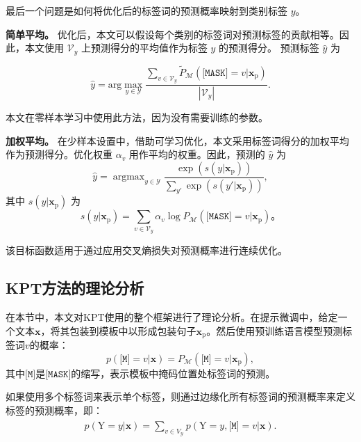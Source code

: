 最后一个问题是如何将优化后的标签词的预测概率映射到类别标签 $y$。

\textbf{简单平均。} 优化后，本文可以假设每个类别的标签词对预测标签的贡献相等。因此，本文使用 $\mathcal{V}_y$ 上预测得分的平均值作为标签 $y$ 的预测得分。
预测标签 $\hat{y}$ 为

\begin{equation}
\hat{y}\!=\!
    \mathrm{arg}\!\max_{y\in\mathcal{Y}}\frac{\sum_{v \in \mathcal{V}_{y}}\! \tilde{P}_{\mathcal{M}}(\!\texttt{[MASK]}=v|\mathbf{x}_{\text{p}})}{|\mathcal{V}_y|}.
\end{equation}

本文在零样本学习中使用此方法，因为没有需要训练的参数。

\textbf{加权平均。} 在少样本设置中，借助可学习优化，本文采用标签词得分的加权平均作为预测得分。优化权重 $\alpha_v$ 用作平均的权重。因此，预测的 $\hat{y}$ 为
\begin{equation}
\hat{y} \!= \operatorname{argmax}_{y\in\mathcal{Y}} \frac{\exp\left({s(y|\mathbf{x}_{\text{p}})}\right)}{\sum_{y'}\exp\left({s({y'}|\mathbf{x}_{\text{p}})}\right)},
\end{equation}
其中 $s(y|\mathbf{x}_{\text{p}})$ 为
\begin{equation}
        s(y|\mathbf{x}_{\text{p}})\!=\!\! \sum_{v\in\mathcal{V}_y} \!\!\alpha_v  \operatorname{log}{P}_{\mathcal{M}}(\texttt{[MASK]}\!\!\!=\!v|\mathbf{x}_{\text{p}})。
\end{equation}

该目标函数适用于通过应用交叉熵损失对预测概率进行连续优化。


\subsection{KPT方法的理论分析}

在本节中，本文对KPT使用的整个框架进行了理论分析。在提示微调中，给定一个文本$\mathbf{x}$，将其包装到模板中以形成包装句子$\mathbf{x}_{\text{p}}$。然后使用预训练语言模型预测标签词$v$的概率：
\begin{equation}
    p(\texttt{[M]}\!\!\!=\!v|\mathbf{x}) = P_{\mathcal{M}}(\texttt{[M]}\!\!\!=\!v|\mathbf{x}_{\text{p}}),
\end{equation}
其中$\texttt{[M]}$是$\texttt{[MASK]}$的缩写，表示模板中掩码位置处标签词的预测。

如果使用多个标签词来表示单个标签，则通过边缘化所有标签词的预测概率来定义标签的预测概率，即：
\begin{align}
\begin{split}
  p(\text{Y}\!=\!y|\mathbf{x}) \!=\!\! \sum_{v\in V_{\mathcal{Y}}} p(\text{Y}\!=\!y, \texttt{[M]}\!\!\!=\!v|\mathbf{x}).
\end{split}
\label{appequ_1}
\end{align}

